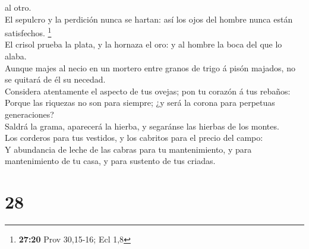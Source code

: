 al otro.\\
 El sepulcro y la perdición nunca se hartan: así los ojos
del hombre nunca están satisfechos. \footnote{\textbf{27:20} Prov
  30,15-16; Ecl 1,8}\\
 El crisol prueba la plata, y la hornaza el oro: y al
hombre la boca del que lo alaba.\\
 Aunque majes al necio en un mortero entre granos de trigo
á pisón majados, no se quitará de él su necedad.\\
 Considera atentamente el aspecto de tus ovejas; pon tu
corazón á tus rebaños:\\
 Porque las riquezas no son para siempre; ¿y será la corona
para perpetuas generaciones?\\
 Saldrá la grama, aparecerá la hierba, y segaránse las
hierbas de los montes.\\
 Los corderos para tus vestidos, y los cabritos para el
precio del campo:\\
 Y abundancia de leche de las cabras para tu mantenimiento,
y para mantenimiento de tu casa, y para sustento de tus criadas.

\hypertarget{section-27}{%
\section{28}\label{section-27}}


